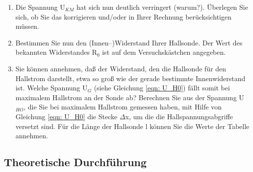 \documentclass[12pt]{scrartcl}
\begin{document}
\begin{enumerate}
\begin{enumerate}
\item
Die Spannung U$_{KM}$ hat sich nun deutlich verringert (warum?).
Überlegen Sie sich, ob Sie das korrigieren und/oder in Ihrer Rechnung berücksichtigen
müssen.
\newline
\item
Bestimmen Sie nun den (Innen–)Widerstand Ihrer Hallsonde. Der Wert des bekannten Widerstandes R$_0$ ist auf dem Versuchskästchen angegeben.
\newline
\item
Sie können annehmen, daß der Widerstand, den die Hallsonde für den Hallstrom darstellt, etwa so groß wie der gerade bestimmte Innenwiderstand ist. Welche Spannung U$_G$ (siehe Gleichung \ref{eqn: U_H0}) fällt somit bei maximalem Hallstrom an der Sonde ab? Berechnen Sie aus der Spannung U$_{HO}$, die Sie bei maximalem Hallstrom gemessen haben, mit Hilfe von Gleichung \ref{eqn: U_H0} die Stecke $\Delta$x, um die die Hallspannungsabgriffe versetzt sind. Für die Länge der Hallsonde
l können Sie die Werte der Tabelle annehmen.
\end{enumerate}
\end{enumerate}

\subsection{Theoretische Durchführung}
\end{document}
